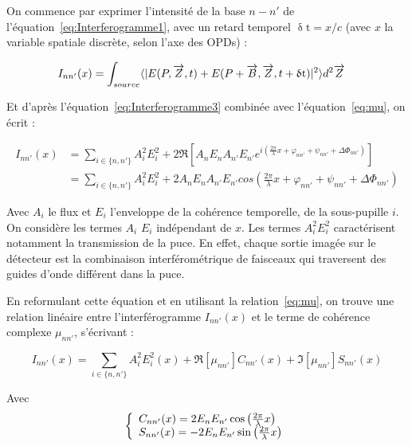 On commence par exprimer l'intensité de la base $n-n'$ de l'équation~\ref{eq:Interferogramme1}, avec un retard temporel $\updelta \text{t} = x / c$ (avec $x$ la variable spatiale discrète, selon l'axe des \ac{OPD}s) :

\begin{align}
    I_{nn'}(x) &= \int_{source} \langle | E(P,\overrightarrow{Z},t) + E(P+\overrightarrow{B},\overrightarrow{Z},t + \updelta \text{t}) |^2 \rangle d^2\overrightarrow{Z}
\end{align}

Et d'après l'équation~\ref{eq:Interferogramme3} combinée avec l'équation~\ref{eq:mu}, on écrit : 

\begin{align}
    I_{nn'}(x) &= \sum_{i \in \{n,n'\}} A_i^2 E_i^2 + 2 \Re \left[ A_n E_n A_{n'} E_{n'} e^{i(\frac{2 \pi}{\lambda}x + \varphi_{nn'} + \psi_{nn'} + \Delta\Phi_{nn'})}  \right] \\
    &= \sum_{i \in \{n,n'\}} A_{i}^{2} E_{i}^{2} + 2 A_n E_n A_{n'} E_{n'} cos \left(\frac{2 \pi}{\lambda}x + \varphi_{nn'} + \psi_{nn'} + \Delta\Phi_{nn'} \right)
\end{align}

Avec $A_i$ le flux et $E_i$ l'enveloppe de la cohérence temporelle, de la sous-pupille $i$. On considère les termes $A_i$ $E_i$ indépendant de $x$. Les termes $A_i^2 E_i^2$ caractérisent notamment la transmission de la puce. En effet, chaque sortie imagée sur le détecteur est la combinaison interférométrique de faisceaux qui traversent des guides d'onde différent dans la puce.

En reformulant cette équation et en utilisant la relation~\ref{eq:mu}, on trouve une relation linéaire entre l'interférogramme $I_{nn'}(x)$ et le terme de cohérence complexe $\mu_{nn'}$, s'écrivant :

\begin{equation}
    I_{nn'}(x) = \sum_{i \in \{n,n'\}} A_{i}^{2} E_{i}^{2}(x) + \Re [\mu_{nn'}] C_{nn'}(x) + \Im [\mu_{nn'}] S_{nn'}(x) \label{eq:InterferogrammeLineaire}
\end{equation}

Avec
\begin{align}
    \left\{
    \begin{array}{r@{}l}\displaystyle
    &C_{nn'}(x) = 2E_n E_{n'}\cos \left( \frac{2 \pi}{\lambda}x \right) \\
    &S_{nn'}(x) = -2E_n E_{n'}\sin \left( \frac{2 \pi}{\lambda}x \right)
    \end{array}\right. \label{eq:V2PMtermesComplexes}
\end{align}

